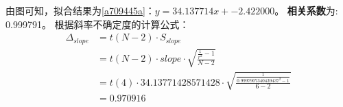 由图可知，拟合结果为\ref{a709445a}：$y=34.137714x+-2.422000$。
\textbf{相关系数}为: 0.999791。
根据斜率不确定度的计算公式：
\begin{align}
    \Delta_{slope} & =t(N-2)\cdot S_{slope} \\ & = t(N-2)\cdot slope\cdot  \sqrt{\frac{\frac{1}{r^2}-1}{N-2}}\\ & = t(4)\cdot 34.13771428571428\cdot \sqrt{\frac{\frac{1}{0.9997907340439437^2-1}}{6-2}} \\ &= 0.970916
\end{align}